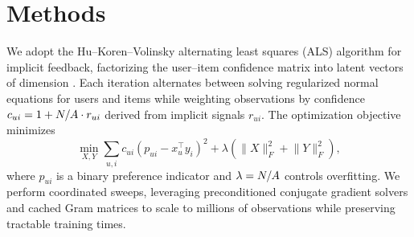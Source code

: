 \section{Methods}
We adopt the Hu--Koren--Volinsky alternating least squares (ALS) algorithm for implicit feedback, factorizing the user--item confidence matrix into latent vectors of dimension \rankParam. Each iteration alternates between solving regularized normal equations for users and items while weighting observations by confidence $c_{ui} = 1 + N/A \cdot r_{ui}$ derived from implicit signals $r_{ui}$. The optimization objective minimizes
\begin{equation}
    \min_{X,Y} \sum_{u,i} c_{ui}\left(p_{ui} - x_u^\top y_i\right)^2 + \lambda \left(\lVert X \rVert_F^2 + \lVert Y \rVert_F^2\right),
\end{equation}
where $p_{ui}$ is a binary preference indicator and $\lambda=N/A$ controls overfitting. We perform \itersParam{} coordinated sweeps, leveraging preconditioned conjugate gradient solvers and cached Gram matrices to scale to millions of observations while preserving tractable training times.
